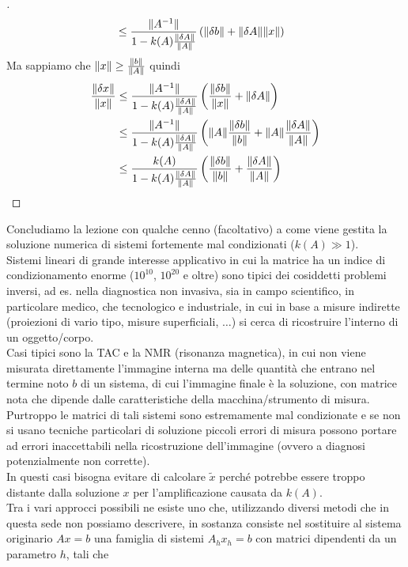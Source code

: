 \documentclass[12pt,a4paper]{article}
\DeclarePairedDelimiter{\norma}{\lVert}{\rVert}
\begin{document}
\begin{proof}[\unskip\nopunct]
\begin{align*}
    &\le \frac{\norma{A^{-1}}}{1 - k(A) \frac{\norma{\delta A}}{\norma{A}}} \left(\norma{\delta b} + \norma{\delta A}\norma{x}\right)
\end{align*}
Ma sappiamo che $\norma{x} \ge \frac{\norma{b}}{\norma{A}}$ quindi
\begin{align*}
    \frac{\norma{\delta x}}{\norma{x}} & \le \frac{\norma{A^{-1}}}{1 - k(A) \frac{\norma{\delta A}}{\norma{A}}} \left(\frac{\norma{\delta b}}{\norma{x}} + \norma{\delta A}\right) \\
    & \le \frac{\norma{A^{-1}}}{1 - k(A) \frac{\norma{\delta A}}{\norma{A}}} \left(\norma{A}\frac{\norma{\delta b}}{\norma{b}} + \norma{A} \frac{\norma{\delta A}}{\norma{A}}\right) \\
    & \le \frac{k(A)}{1 - k(A) \frac{\norma{\delta A}}{\norma{A}}} \left(\frac{\norma{\delta b}}{\norma{b}} + \frac{\norma{\delta A}}{\norma{A}}\right)
\end{align*}
\end{proof}
Concludiamo la lezione con qualche cenno (facoltativo) a come viene gestita la soluzione numerica di sistemi fortemente mal condizionati ($k(A) \gg 1$). \\
Sistemi lineari di grande interesse applicativo in cui la matrice ha un indice di condizionamento enorme ($10^{10}$, $10^{20}$ e oltre) sono tipici dei cosiddetti problemi inversi, ad es. nella diagnostica non invasiva, sia in campo scientifico, in particolare medico, che tecnologico e industriale, in cui in base a misure indirette (proiezioni di vario tipo, misure superficiali, $\dots$) si cerca di ricostruire l'interno di un oggetto/corpo. \\
Casi tipici sono la TAC e la NMR (risonanza magnetica), in cui non viene misurata direttamente l'immagine interna ma delle quantità che entrano nel termine noto $b$ di un sistema, di cui l'immagine finale è la soluzione, con matrice nota che dipende dalle caratteristiche della macchina/strumento di misura. \\
Purtroppo le matrici di tali sistemi sono estremamente mal condizionate e se non si usano tecniche particolari di soluzione piccoli errori di misura possono portare ad errori inaccettabili nella ricostruzione dell'immagine (ovvero a diagnosi potenzialmente non corrette). \\
In questi casi bisogna evitare di calcolare $\tilde{x}$ perché potrebbe essere troppo distante dalla soluzione $x$ per l'amplificazione causata da $k(A)$.\\
Tra i vari approcci possibili ne esiste uno che, utilizzando diversi metodi che in questa sede non possiamo descrivere, in sostanza consiste nel sostituire al sistema originario $Ax=b$ una famiglia di sistemi $A_h x_h = b$ con matrici dipendenti da un parametro $h$, tali che
\end{document}
